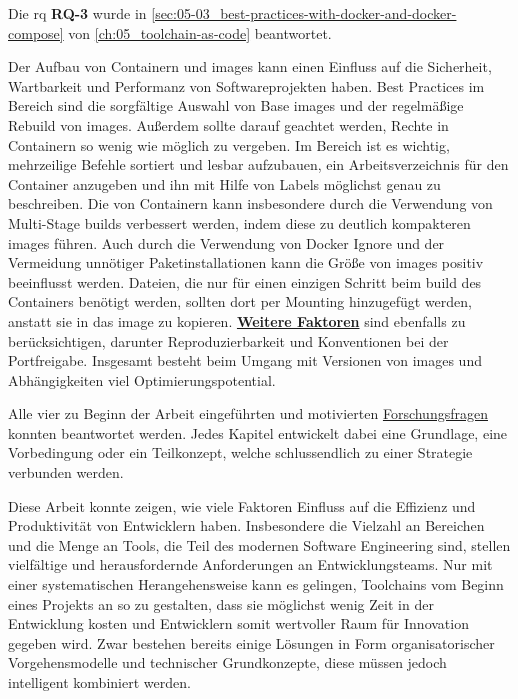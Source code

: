 Die \acrlong{rq} \textbf{RQ-3} wurde in \autoref{sec:05-03_best-practices-with-docker-and-docker-compose} von \autoref{ch:05_toolchain-as-code} beantwortet.

Der Aufbau von Containern und \Glspl{image} kann einen Einfluss auf die Sicherheit, Wartbarkeit und Performanz von Softwareprojekten haben. Best Practices im Bereich \textbf{} sind die sorgfältige Auswahl von Base \Glspl{image} und der regelmäßige Rebuild von \Glspl{image}. Außerdem sollte darauf geachtet werden, Rechte in Containern so wenig wie möglich zu vergeben. Im Bereich \textbf{} ist es wichtig, mehrzeilige Befehle sortiert und lesbar aufzubauen, ein Arbeitsverzeichnis für den Container anzugeben und ihn mit Hilfe von Labels möglichst genau zu beschreiben. Die \textbf{} von Containern kann insbesondere durch die Verwendung von Multi-Stage \Glspl{build} verbessert werden, indem diese zu deutlich kompakteren \Glspl{image} führen. Auch durch die Verwendung von Docker Ignore und der Vermeidung unnötiger Paketinstallationen kann die Größe von \Glspl{image} positiv beeinflusst werden. Dateien, die nur für einen einzigen Schritt beim \Gls{build} des Containers benötigt werden, sollten dort per Mounting hinzugefügt werden, anstatt sie in das \Gls{image} zu kopieren. \textbf{\hyperref[subsec:05-03-04_further]{Weitere Faktoren}} sind ebenfalls zu berücksichtigen, darunter Reproduzierbarkeit und Konventionen bei der Portfreigabe. Insgesamt besteht beim Umgang mit Versionen von \Glspl{image} und Abhängigkeiten viel Optimierungspotential.

\vspace{2em}

Alle vier zu Beginn der Arbeit eingeführten und motivierten \hyperref[sec:01-03_objectives-and-research-questions]{Forschungsfragen} konnten beantwortet werden. Jedes Kapitel entwickelt dabei eine Grundlage, eine Vorbedingung oder ein Teilkonzept, welche schlussendlich zu einer Strategie verbunden werden.

Diese Arbeit konnte zeigen, wie viele Faktoren Einfluss auf die Effizienz und Produktivität von Entwicklern haben. Insbesondere die Vielzahl an Bereichen und die Menge an Tools, die Teil des modernen Software Engineering sind, stellen vielfältige und herausfordernde Anforderungen an Entwicklungsteams. Nur mit einer systematischen Herangehensweise kann es gelingen, Toolchains vom Beginn eines Projekts an so zu gestalten, dass sie möglichst wenig Zeit in der Entwicklung kosten und Entwicklern somit wertvoller Raum für Innovation gegeben wird. Zwar bestehen bereits einige Lösungen in Form organisatorischer Vorgehensmodelle und technischer Grundkonzepte, diese müssen jedoch intelligent kombiniert werden.

